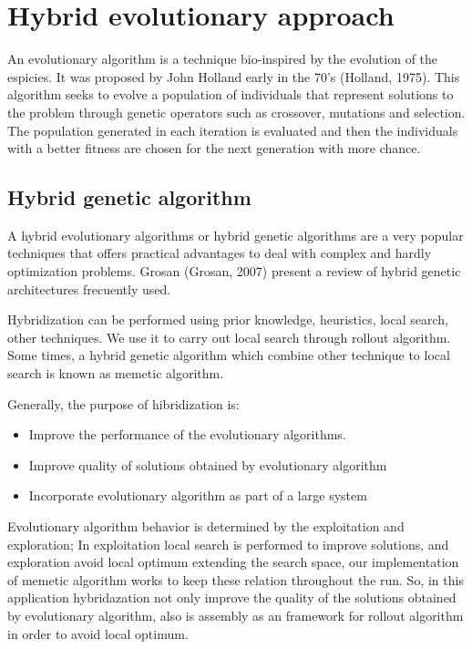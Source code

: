 \chapter{Hybrid evolutionary approach}
\label{chap:methodology}

An evolutionary algorithm is a technique bio-inspired by the evolution of the espicies. It was proposed by John Holland early in the 70's (Holland, 1975). This algorithm seeks to evolve a population of individuals that represent solutions to the problem through genetic operators such as crossover, mutations and selection. The population generated in each iteration is evaluated and then the individuals with a better fitness are chosen for the next generation with more chance.

\section{Hybrid genetic algorithm}

A hybrid evolutionary algorithms or hybrid genetic algorithms are a very popular techniques that offers practical advantages to deal with complex and hardly optimization problems. Grosan (Grosan, 2007) present a review of hybrid genetic architectures frecuently used. 

Hybridization can be performed using prior knowledge, heuristics, local search, other techniques. We use it to carry out local search through rollout algorithm. Some times, a hybrid genetic algorithm which combine other technique to local search is known as memetic algorithm.

Generally, the purpose of hibridization is:

\begin{itemize}
 \item Improve the performance of the evolutionary algorithms.
 \item Improve quality of solutions obtained by evolutionary algorithm
 \item Incorporate evolutionary algorithm as part of a large system
\end{itemize}

Evolutionary algorithm behavior is determined by the exploitation and exploration; In exploitation local search is performed to improve solutions, and exploration avoid local optimum extending the search space, our implementation of memetic algorithm works to keep these relation throughout the run. So, in this application hybridazation not only improve the quality of the solutions obtained by evolutionary algorithm, also is assembly as an framework for rollout algorithm in order to avoid local optimum.


